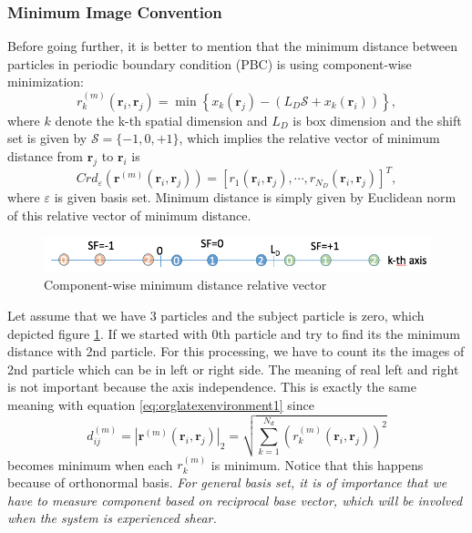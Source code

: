 \documentclass[10pt, a4paper]{article}
\begin{document}
\begin{appendices}
\subsubsection{Minimum Image Convention}
\label{sec:orgheadline4}
Before going further, it is better to mention that the minimum distance between particles in periodic boundary condition (PBC) is using component-wise minimization:
\begin{equation}
\label{eq:orglatexenvironment1}
r^{(m)}_k(\mathbf{r}_i, \mathbf{r}_j) = \min\left\{x_k(\mathbf{r}_j) - \left(L_D\mathscr{S} + x_k(\mathbf{r}_i)\right)\right\},
\end{equation}
where \(k\) denote the k-th spatial dimension and \(L_D\) is box dimension and the shift set is given by \(\mathscr{S} = \{-1, 0, +1\}\),
which implies the relative vector of minimum distance from \(\mathbf{r}_j\) to \(\mathbf{r}_i\) is
\begin{equation}
Crd_{\varepsilon}\left(\mathbf{r}^{(m)}(\mathbf{r}_i, \mathbf{r}_j)\right) = [r_1(\mathbf{r}_i, \mathbf{r}_j), \cdots, r_{N_D}(\mathbf{r}_i, \mathbf{r}_j)]^T,
\end{equation}
where \(\varepsilon\) is given basis set. Minimum distance is simply given by Euclidean norm of this relative vector of minimum distance.

\begin{figure}
\centering
\includegraphics[width=.9\linewidth]{../data_structure/comp_minimum_distance.png}
\caption{Component-wise minimum distance relative vector}
\label{orgkeyword2}
\end{figure}

Let assume that we have 3 particles and the subject particle is zero, which depicted figure \ref{orgkeyword2}. If we started with 0th particle and try to find its the minimum distance with 2nd particle. For this processing, we have to count its the images of 2nd particle which can be in left or right side. The meaning of real left and right is not important because the axis independence. This is exactly the same meaning with equation \ref{eq:orglatexenvironment1} since
\begin{equation}
d^{(m)}_{ij} = \left|\mathbf{r}^{(m)}(\mathbf{r}_i, \mathbf{r}_j)\right|_2 = \sqrt{\sum_{k=1}^{N_d} (r^{(m)}_k(\mathbf{r}_i, \mathbf{r}_j))^2}
\end{equation}
becomes minimum when each \(r^{(m)}_k\) is minimum. Notice that this happens because of orthonormal basis. \emph{For general basis set, it is of importance that we have to measure component based on reciprocal base vector, which will be involved when the system is experienced shear.} 


\end{appendices}
\end{document}
